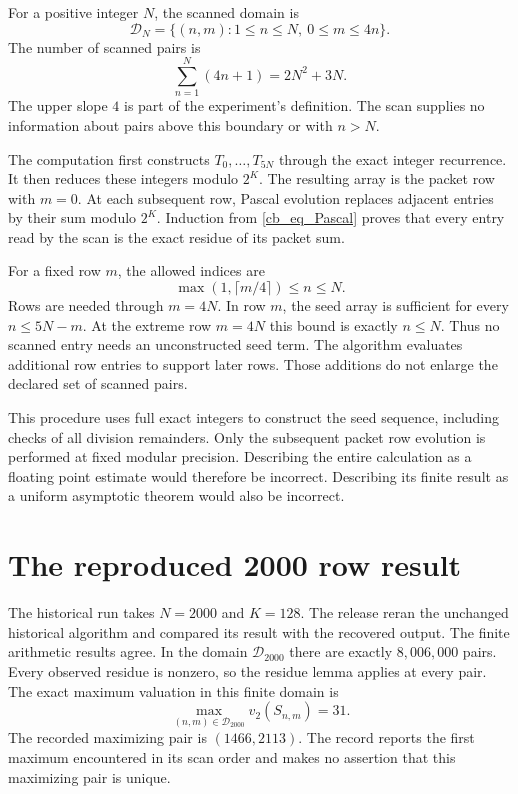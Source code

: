 For a positive integer $N$, the scanned domain is
\begin{equation}\label{cb_eq_scan_domain}
 \mathcal D_N=\{(n,m):1\leq n\leq N,\ 0\leq m\leq4n\}.
\end{equation}
The number of scanned pairs is
\begin{equation}\label{cb_eq_scan_count}
 \sum_{n=1}^N(4n+1)=2N^2+3N.
\end{equation}
The upper slope $4$ is part of the experiment's definition. The
scan supplies no information about pairs above this boundary or with
$n>N$.

The computation first constructs $T_0,\ldots,T_{5N}$ through the exact
integer recurrence. It then reduces these integers modulo $2^K$. The
resulting array is the packet row with $m=0$. At each subsequent row,
Pascal evolution replaces adjacent entries by their sum modulo $2^K$.
Induction from \eqref{cb_eq_Pascal} proves that every entry read by the
scan is the exact residue of its packet sum.

For a fixed row $m$, the allowed indices are
\[
 \max(1,\lceil m/4\rceil)\leq n\leq N.
\]
Rows are needed through $m=4N$. In row $m$, the seed array is sufficient
for every $n\leq5N-m$. At the extreme row $m=4N$ this bound is exactly
$n\leq N$. Thus no scanned entry needs an unconstructed seed term.
The algorithm evaluates additional row entries to support later rows.
Those additions do not enlarge the declared set of scanned pairs.

This procedure uses full exact integers to construct the seed sequence,
including checks of all division remainders. Only the subsequent packet
row evolution is performed at fixed modular precision. Describing the
entire calculation as a floating point estimate would therefore be
incorrect. Describing its finite result as a uniform asymptotic theorem
would also be incorrect.

\section{The reproduced 2000 row result}

The historical run takes $N=2000$ and $K=128$. The release reran the
unchanged historical algorithm and compared its result with the recovered
output. The finite arithmetic results agree. In the domain
$\mathcal D_{2000}$ there are exactly $8{,}006{,}000$ pairs. Every observed
residue is nonzero, so the residue lemma applies at every pair. The exact
maximum valuation in this finite domain is
\begin{equation}\label{cb_eq_finite_max}
 \max_{(n,m)\in\mathcal D_{2000}}v_2(S_{n,m})=31.
\end{equation}
The recorded maximizing pair is $(1466,2113)$. The record reports the
first maximum encountered in its scan order and makes no assertion that
this maximizing pair is unique.

